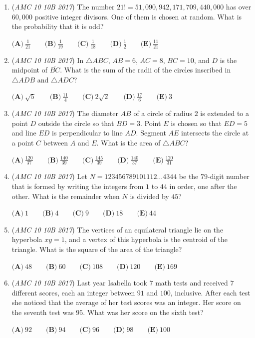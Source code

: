 \begin{enumerate}
	\item (\textit{AMC 10 10B 2017}) The number $21!=51,090,942,171,709,440,000$ has over $60,000$ positive integer divisors. One of them is chosen at random. What is the probability that it is odd?


 $\textbf{(A)}\ \frac{1}{21} \qquad \textbf{(B)}\ \frac{1}{19} \qquad \textbf{(C)}\ \frac{1}{18} \qquad \textbf{(D)}\ \frac{1}{2} \qquad \textbf{(E)}\ \frac{11}{21}$


	\item (\textit{AMC 10 10B 2017}) In $\triangle ABC$, $AB=6$, $AC=8$, $BC=10$, and $D$ is the midpoint of $\overline{BC}$. What is the sum of the radii of the circles inscribed in $\triangle ADB$ and $\triangle ADC$?


 $\textbf{(A)}\ \sqrt{5}\qquad\textbf{(B)}\ \frac{11}{4}\qquad\textbf{(C)}\ 2\sqrt{2}\qquad\textbf{(D)}\ \frac{17}{6}\qquad\textbf{(E)}\ 3$


	\item (\textit{AMC 10 10B 2017}) The diameter $AB$ of a circle of radius $2$ is extended to a point $D$ outside the circle so that $BD=3$. Point $E$ is chosen so that $ED=5$ and line $ED$ is perpendicular to line $AD$. Segment $AE$ intersects the circle at a point $C$ between $A$ and $E$. What is the area of $\triangle  ABC$?


 $\textbf{(A)}\ \frac{120}{37}\qquad\textbf{(B)}\ \frac{140}{39}\qquad\textbf{(C)}\ \frac{145}{39}\qquad\textbf{(D)}\ \frac{140}{37}\qquad\textbf{(E)}\ \frac{120}{31}$


	\item (\textit{AMC 10 10B 2017}) Let $N=123456789101112\dots4344$ be the $79$-digit number that is formed by writing the integers from $1$ to $44$ in order, one after the other. What is the remainder when $N$ is divided by $45$?


 $\textbf{(A)}\ 1\qquad\textbf{(B)}\ 4\qquad\textbf{(C)}\ 9\qquad\textbf{(D)}\ 18\qquad\textbf{(E)}\ 44$


	\item (\textit{AMC 10 10B 2017}) The vertices of an equilateral triangle lie on the hyperbola $xy=1$, and a vertex of this hyperbola is the centroid of the triangle. What is the square of the area of the triangle?


 $\textbf{(A)}\ 48\qquad\textbf{(B)}\ 60\qquad\textbf{(C)}\ 108\qquad\textbf{(D)}\ 120\qquad\textbf{(E)}\ 169$


	\item (\textit{AMC 10 10B 2017}) Last year Isabella took $7$ math tests and received $7$ different scores, each an integer between $91$ and $100$, inclusive. After each test she noticed that the average of her test scores was an integer. Her score on the seventh test was $95$. What was her score on the sixth test?


 $\textbf{(A)}\ 92\qquad\textbf{(B)}\ 94\qquad\textbf{(C)}\ 96\qquad\textbf{(D)}\ 98\qquad\textbf{(E)}\ 100$


\end{enumerate}